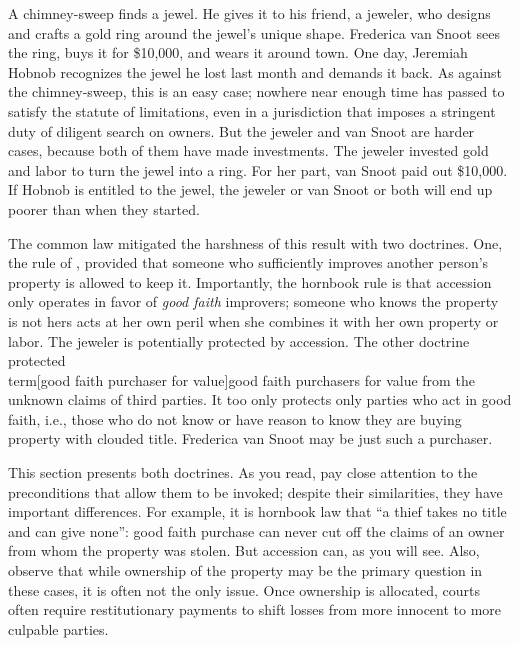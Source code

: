 A chimney-sweep finds a jewel. He gives it to his friend, a jeweler, who designs
and crafts a gold ring around the jewel's unique shape. Frederica van Snoot
sees the ring, buys it for \$10,000, and wears it around town. One day,
Jeremiah Hobnob recognizes the jewel he lost last month and demands it back. As
against the chimney-sweep, this is an easy case; nowhere near enough time has
passed to satisfy the statute of limitations, even in a jurisdiction that
imposes a stringent duty of diligent search on owners. But the jeweler and van
Snoot are harder cases, because both of them have made investments. The jeweler
invested gold and labor to turn the jewel into a ring. For her part, van Snoot
paid out \$10,000. If Hobnob is entitled to the jewel, the jeweler or van Snoot
or both will end up poorer than when they started.

The common law mitigated the harshness of this result with two doctrines. One,
the rule of , provided that someone who sufficiently improves
another person's property is allowed to keep it. Importantly, the hornbook rule
is that accession only operates in favor of \textit{good faith} improvers;
someone who knows the property is not hers acts at her own peril when she
combines it with her own property or labor. The jeweler is potentially
protected by accession. The other doctrine protected \\term[good faith
purchaser for value]{good faith
purchasers for value} from the unknown claims of third parties. It too only
protects only parties who act in good faith, i.e., those who do not know or
have reason to know they are buying property with clouded title. Frederica van
Snoot may be just such a purchaser. 

This section presents both doctrines. As you read, pay close attention to the
preconditions that allow them to be invoked; despite their similarities, they
have important differences. For example, it is hornbook law that ``a thief
takes no title and can give none'': good faith purchase can never cut off the
claims of an owner from whom the property was stolen. But accession can, as you
will see. Also, observe that while ownership of the property may be the primary
question in these cases, it is often not the only issue. Once ownership is
allocated, courts often require restitutionary payments to shift losses from
more innocent to more culpable parties. 


